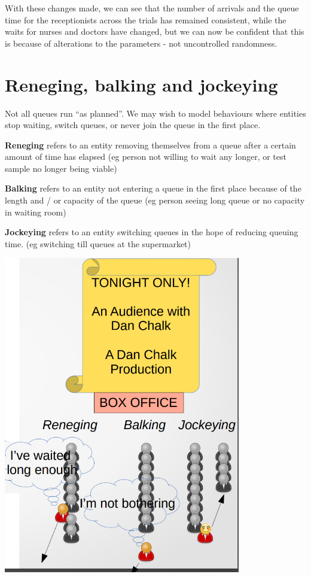 \documentclass[
  letterpaper,
  DIV=11,
  numbers=noendperiod]{scrreprt}
\begin{document}
With these changes made, we can see that the number of arrivals and the
queue time for the receptionists across the trials has remained
consistent, while the waits for nurses and doctors have changed, but we
can now be confident that this is because of alterations to the
parameters - not uncontrolled randomness.

\chapter{Reneging, balking and
jockeying}\label{reneging-balking-and-jockeying}

Not all queues run ``as planned''. We may wish to model behaviours where
entities stop waiting, switch queues, or never join the queue in the
first place.

\textbf{Reneging} refers to an entity removing themselves from a queue
after a certain amount of time has elapsed (eg person not willing to
wait any longer, or test sample no longer being viable)

\textbf{Balking} refers to an entity not entering a queue in the first
place because of the length and / or capacity of the queue (eg person
seeing long queue or no capacity in waiting room)

\textbf{Jockeying} refers to an entity switching queues in the hope of
reducing queuing time. (eg switching till queues at the supermarket)

\includegraphics{images/reneging_balking_jockeying_overview.png}
\end{document}
